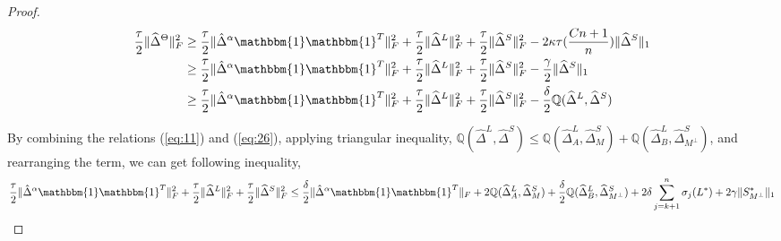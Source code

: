 \documentclass[AMS,STIX1COL]{WileyNJD-v2}
\begin{document}
\begin{proof}
\begin{align}
    \frac{\tau}{2}\|\widehat{\Delta}^{\Theta}\|_{F}^{2}  \nonumber
    &\geq \frac{\tau}{2} \|\hat{\Delta}^{\alpha}\mathbbm{1}\mathbbm{1}^T\|_{F}^{2} + \frac{\tau}{2} \|\widehat{\Delta}^{L}\|_{F}^{2} + \frac{\tau}{2} \|\widehat{\Delta}^{S}\|_{F}^{2} 
    - 2\kappa\tau(\frac{Cn+1}{n})\|\widehat{\Delta}^{S}\|_{1} \\ \nonumber
    &\geq \frac{\tau}{2} \|\hat{\Delta}^{\alpha}\mathbbm{1}\mathbbm{1}^T\|_{F}^{2} + \frac{\tau}{2} \|\widehat{\Delta}^{L}\|_{F}^{2} + \frac{\tau}{2} \|\widehat{\Delta}^{S}\|_{F}^{2} - \frac{\gamma}{2}\|\widehat{\Delta}^{S}\|_{1}\\
    &\geq \frac{\tau}{2} \|\hat{\Delta}^{\alpha}\mathbbm{1}\mathbbm{1}^T\|_{F}^{2} + \frac{\tau}{2} \|\widehat{\Delta}^{L}\|_{F}^{2} + \frac{\tau}{2} \|\widehat{\Delta}^{S}\|_{F}^{2} - \frac{\delta}{2} \mathbb{Q}(\widehat{\Delta}^L,\widehat{\Delta}^S) \label{eq:26}
\end{align}

By combining the relations (\ref{eq:11}) and (\ref{eq:26}), applying triangular inequality, $\mathbb{Q}(\widehat{\Delta}^L,\widehat{\Delta}^S)\leq \mathbb{Q}(\widehat{\Delta}^L_{A},\widehat{\Delta}^S_{M}) + \mathbb{Q}(\widehat{\Delta}^L_{B},\widehat{\Delta}^S_{M^{\perp}})$, and rearranging the term, we can get following inequality, 
\[
    \frac{\tau}{2} \|\hat{\Delta}^{\alpha}\mathbbm{1}\mathbbm{1}^T\|_{F}^{2} + \frac{\tau}{2} \|\widehat{\Delta}^{L}\|_{F}^{2} + \frac{\tau}{2} \|\widehat{\Delta}^{S}\|_{F}^{2} \\
    \leq \frac{\delta}{2} \|\hat{\Delta}^{\alpha}\mathbbm{1}\mathbbm{1}^T\|_{F} + 
    2\mathbb{Q}(\widehat{\Delta}^L_{A},\widehat{\Delta}^S_{M}) +  \frac{\delta}{2} \mathbb{Q}(\widehat{\Delta}^L_{B},\widehat{\Delta}^S_{M^\perp}) + 
    2 \delta \sum_{j=k+1}^{n} \sigma_{j}(L^{*}) + 2\gamma   
    \|S^{*}_{M^\perp}\|_{1}
\]


\end{proof}
\end{document}
